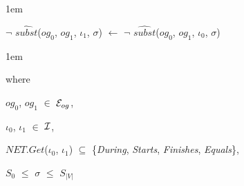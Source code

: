 \documentclass[11pt]{report}
\newenvironment{vquote}
{
  \begin{list}{}{\leftmargin 1em}\item[]
}
{
  \end{list}
}
\begin{document}
\begin{enumerate}
                \begin{vquote}
                  $\lnot$ $\hat{subst}$($og_0$, $og_1$, $\iota_1$, $\sigma$)
                  $\leftarrow$
                  $\lnot$ $\hat{subst}$($og_0$, $og_1$, $\iota_0$, $\sigma$)
                \end{vquote}

                \begin{vquote}
                  where

                  \hspace{1em}
                  $og_0$, $og_1$ $\in$ ${\cal E}_{og}$,

                  \hspace{1em}
                  $\iota_0$, $\iota_1$ $\in$ ${\cal I}$,

                  \hspace{1em}
                  $NET.Get$($\iota_0$, $\iota_1$) $\subseteq$
                  \{{\em During}, {\em Starts}, {\em Finishes}, {\em Equals}\},

                  \hspace{1em}
                  $S_0$ $\leq$ $\sigma$ $\leq$ $S_{|V|}$
                \end{vquote}

            \end{enumerate}
\end{document}
